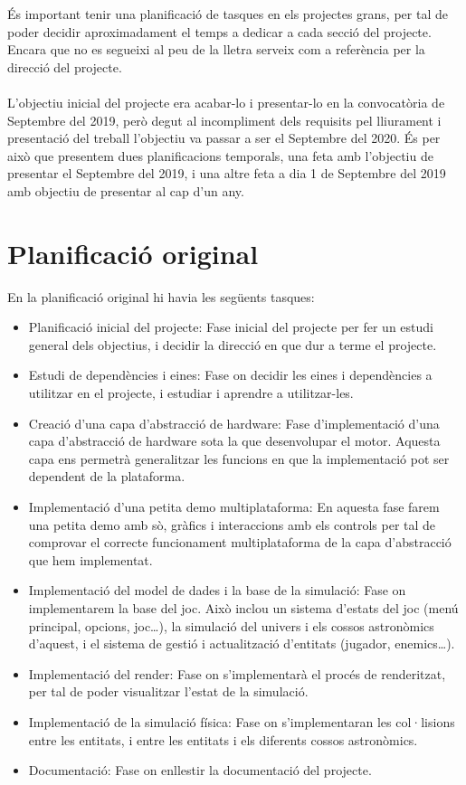 És important tenir una planificació de tasques en els projectes grans, per tal de poder decidir aproximadament el temps a dedicar a cada secció del projecte.
Encara que no es segueixi al peu de la lletra serveix com a referència per la direcció del projecte.
\\ \\
L'objectiu inicial del projecte era acabar-lo i presentar-lo en la convocatòria de Septembre del 2019, però degut al incompliment dels requisits pel lliurament i presentació del treball l'objectiu va passar a ser el Septembre del 2020.
És per això que presentem dues planificacions temporals, una feta amb l'objectiu de presentar el Septembre del 2019, i una altre feta a dia 1 de Septembre del 2019 amb objectiu de presentar al cap d'un any.

\section{Planificació original}
En la planificació original hi havia les següents tasques:
\begin{itemize}
  \item{Planificació inicial del projecte: }Fase inicial del projecte per fer un estudi general dels objectius, i decidir la direcció en que dur a terme el projecte.
  \item{Estudi de dependències i eines: }Fase on decidir les eines i dependències a utilitzar en el projecte, i estudiar i aprendre a utilitzar-les.
  \item{Creació d'una capa d'abstracció de hardware: }Fase d'implementació d'una capa d'abstracció de hardware sota la que desenvolupar el motor. Aquesta capa ens permetrà generalitzar les funcions en que la implementació pot ser dependent de la plataforma.
  \item{Implementació d'una petita demo multiplataforma: }En aquesta fase farem una petita demo amb sò, gràfics i interaccions amb els controls per tal de comprovar el correcte funcionament multiplataforma de la capa d'abstracció que hem implementat.
  \item{Implementació del model de dades i la base de la simulació: }Fase on implementarem la base del joc. Això inclou un sistema d'estats del joc (menú principal, opcions, joc\ldots), la simulació del univers i els cossos astronòmics d'aquest, i el sistema de gestió i actualització d'entitats (jugador, enemics\ldots).
  \item{Implementació del render: }Fase on s'implementarà el procés de renderitzat, per tal de poder visualitzar l'estat de la simulació.
  \item{Implementació de la simulació física: }Fase on s'implementaran les col·lisions entre les entitats, i entre les entitats i els diferents cossos astronòmics.
  \item{Documentació: }Fase on enllestir la documentació del projecte.
\end{itemize}
